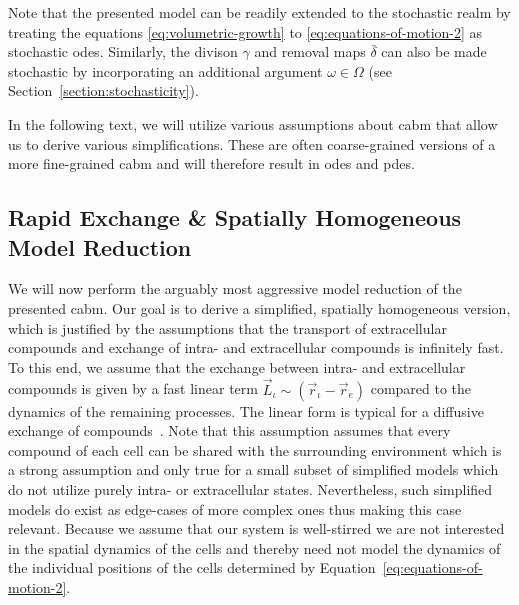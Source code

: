 Note that the presented model can be readily extended to the stochastic realm by treating the
equations \eqref{eq:volumetric-growth} to \eqref{eq:equations-of-motion-2} as stochastic \acp{ode}.
Similarly, the divison $\gamma$ and removal maps $\bar{\delta}$ can also be made stochastic by
incorporating an additional argument $\omega\in\Omega$ (see Section~\ref{section:stochasticity}).

In the following text, we will utilize various assumptions about \ac{cabm} that allow us to derive
various simplifications.
These are often coarse-grained versions of a more fine-grained \ac{cabm} and will therefore result
in \acp{ode} and \acp{pde}.

\subsection{Rapid Exchange \& Spatially Homogeneous Model Reduction}
We will now perform the arguably most aggressive model reduction of the presented \ac{cabm}.
Our goal is to derive a simplified, spatially homogeneous version, which is justified by the
assumptions that the transport of extracellular compounds and exchange of intra- and extracellular
compounds is infinitely fast.
To this end, we assume that the exchange between intra- and extracellular compounds is given by a
fast linear term $\vec{L}_\iota\sim(\vec{r}_\iota - \vec{r}_e)$ compared to the dynamics of the
remaining processes.
The linear form is typical for a diffusive exchange of compounds~\cite{Kedem1958}.
Note that this assumption assumes that every compound of each cell can be shared with the
surrounding environment which is a strong assumption and only true for a small subset of simplified
models which do not utilize purely intra- or extracellular states.
Nevertheless, such simplified models do exist as edge-cases of more complex ones thus making this
case relevant.
Because we assume that our system is well-stirred we are not interested in the spatial dynamics of
the cells and thereby need not model the dynamics of the individual positions of the cells
determined by Equation~\eqref{eq:equations-of-motion-2}.

